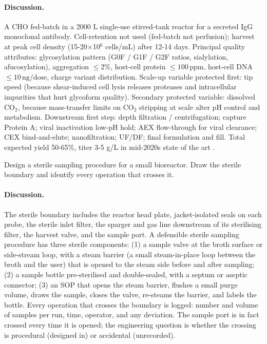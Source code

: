 \paragraph{Discussion.}
A CHO fed-batch in a 2000 L single-use stirred-tank reactor for a
secreted IgG monoclonal antibody. Cell-retention not used (fed-batch
not perfusion); harvest at peak cell density (15-20$\times$10$^6$
cells/mL) after 12-14 days. Principal quality attributes:
glycosylation pattern (G0F / G1F / G2F ratios, sialylation,
afucosylation), aggregation $\le 2\%$, host-cell protein
$\le 100\,\text{ppm}$, host-cell DNA $\le 10\,\text{ng/dose}$,
charge variant distribution. Scale-up variable protected first: tip
speed (because shear-induced cell lysis releases proteases and
intracellular impurities that hurt glycoform quality). Secondary
protected variable: dissolved CO$_2$, because mass-transfer limits
on CO$_2$ stripping at scale alter pH control and metabolism.
Downstream first step: depth filtration / centrifugation; capture
Protein A; viral inactivation low-pH hold; AEX flow-through for
viral clearance; CEX bind-and-elute; nanofiltration; UF/DF; final
formulation and fill. Total expected yield 50-65\%, titer 3-5 g/L
in mid-2020s state of the art \cite{paper:v6c10-li-cho-cellline-2010}.

\begin{exercise}
Design a sterile sampling procedure for a small bioreactor. Draw the
sterile boundary and identify every operation that crosses it.
\end{exercise}

\paragraph{Discussion.}
The sterile boundary includes the reactor head plate, jacket-isolated
seals on each probe, the sterile inlet filter, the sparger and gas
line downstream of its sterilising filter, the harvest valve, and the
sample port. A defensible sterile sampling procedure has three
sterile components: (1) a sample valve at the broth surface or
side-stream loop, with a steam barrier (a small steam-in-place loop
between the broth and the user) that is opened to the steam side
before and after sampling; (2) a sample bottle pre-sterilised and
double-sealed, with a septum or aseptic connector; (3) an SOP that
opens the steam barrier, flushes a small purge volume, draws the
sample, closes the valve, re-steams the barrier, and labels the bottle.
Every operation that crosses the boundary is logged: number and
volume of samples per run, time, operator, and any deviation. The
sample port is in fact crossed every time it is opened; the
engineering question is whether the crossing is procedural (designed
in) or accidental (unrecorded).

